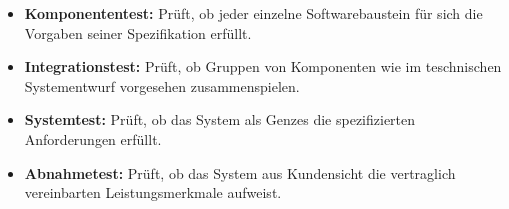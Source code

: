 \begin{itemize}
      \item \textbf{Komponententest:} Prüft, ob jeder einzelne Softwarebaustein für sich die Vorgaben seiner Spezifikation erfüllt.
      \item \textbf{Integrationstest:} Prüft, ob Gruppen von Komponenten wie im teschnischen Systementwurf vorgesehen zusammenspielen.
      \item \textbf{Systemtest:} Prüft, ob das System als Genzes die spezifizierten Anforderungen erfüllt.
      \item \textbf{Abnahmetest:} Prüft, ob das System aus Kundensicht die vertraglich vereinbarten Leistungsmerkmale aufweist.
\end{itemize}
